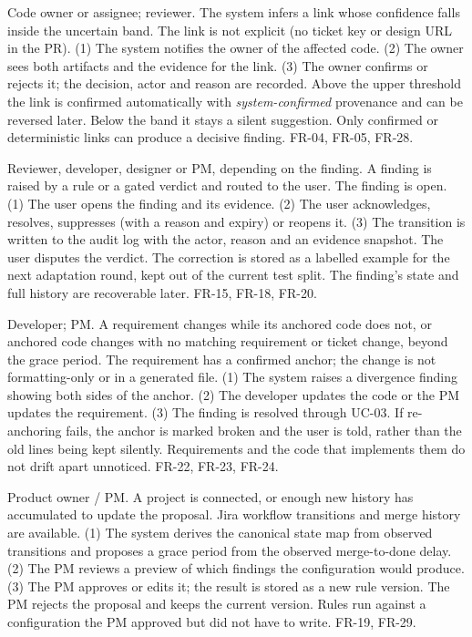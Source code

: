   {Code owner or assignee; reviewer.}
  {The system infers a link whose confidence falls inside the uncertain band.}
  {The link is not explicit (no ticket key or design URL in the PR).}
  {(1) The system notifies the owner of the affected code.
   (2) The owner sees both artifacts and the evidence for the link.
   (3) The owner confirms or rejects it; the decision, actor and reason are
   recorded.}
  {Above the upper threshold the link is confirmed automatically with
   \emph{system-confirmed} provenance and can be reversed later. Below the band
   it stays a silent suggestion.}
  {Only confirmed or deterministic links can produce a decisive finding.}
  {FR-04, FR-05, FR-28.}

  {Reviewer, developer, designer or PM, depending on the finding.}
  {A finding is raised by a rule or a gated verdict and routed to the user.}
  {The finding is open.}
  {(1) The user opens the finding and its evidence.
   (2) The user acknowledges, resolves, suppresses (with a reason and expiry)
   or reopens it.
   (3) The transition is written to the audit log with the actor, reason and an
   evidence snapshot.}
  {The user disputes the verdict. The correction is stored as a labelled
   example for the next adaptation round, kept out of the current test split.}
  {The finding's state and full history are recoverable later.}
  {FR-15, FR-18, FR-20.}

  {Developer; PM.}
  {A requirement changes while its anchored code does not, or anchored code
   changes with no matching requirement or ticket change, beyond the grace
   period.}
  {The requirement has a confirmed anchor; the change is not formatting-only or
   in a generated file.}
  {(1) The system raises a divergence finding showing both sides of the anchor.
   (2) The developer updates the code or the PM updates the requirement.
   (3) The finding is resolved through UC-03.}
  {If re-anchoring fails, the anchor is marked broken and the user is told,
   rather than the old lines being kept silently.}
  {Requirements and the code that implements them do not drift apart unnoticed.}
  {FR-22, FR-23, FR-24.}

  {Product owner / PM.}
  {A project is connected, or enough new history has accumulated to update the
   proposal.}
  {Jira workflow transitions and merge history are available.}
  {(1) The system derives the canonical state map from observed transitions
   and proposes a grace period from the observed merge-to-done delay.
   (2) The PM reviews a preview of which findings the configuration would
   produce.
   (3) The PM approves or edits it; the result is stored as a new rule version.}
  {The PM rejects the proposal and keeps the current version.}
  {Rules run against a configuration the PM approved but did not have to write.}
  {FR-19, FR-29.}

